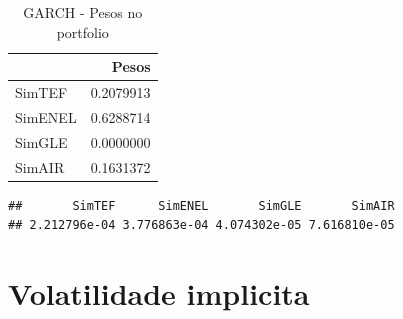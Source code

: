 \documentclass[
  12pt,
  a4paper,
  openany]{book}
\newenvironment{Shaded}{\begin{snugshade}}{\end{snugshade}}
\newcommand{\DataTypeTok}[1]{\textcolor[rgb]{0.13,0.29,0.53}{#1}}
\newcommand{\DecValTok}[1]{\textcolor[rgb]{0.00,0.00,0.81}{#1}}
\newcommand{\FloatTok}[1]{\textcolor[rgb]{0.00,0.00,0.81}{#1}}
\newcommand{\KeywordTok}[1]{\textcolor[rgb]{0.13,0.29,0.53}{\textbf{#1}}}
\newcommand{\NormalTok}[1]{#1}
\newcommand{\OperatorTok}[1]{\textcolor[rgb]{0.81,0.36,0.00}{\textbf{#1}}}
\newcommand{\StringTok}[1]{\textcolor[rgb]{0.31,0.60,0.02}{#1}}
\begin{document}
\normalsize

\begin{table}[!h]

\caption{\label{tab:unnamed-chunk-43}GARCH - Pesos no portfolio}
\centering
\begin{tabular}[t]{lr}
\toprule
  & Pesos\\
\midrule
SimTEF & 0.2079913\\
SimENEL & 0.6288714\\
SimGLE & 0.0000000\\
SimAIR & 0.1631372\\
\bottomrule
\end{tabular}
\end{table}

\scriptsize

\begin{Shaded}
\end{Shaded}

\begin{verbatim}
##       SimTEF      SimENEL       SimGLE       SimAIR 
## 2.212796e-04 3.776863e-04 4.074302e-05 7.616810e-05
\end{verbatim}

\begin{Shaded}
\end{Shaded}

\normalsize

\hypertarget{volatilidade-implicita}{%
\section{Volatilidade implicita}\label{volatilidade-implicita}}
\end{document}
